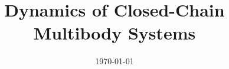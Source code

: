 \documentclass[11pt,oneside]{book}
\begin{document}
\hypersetup{pageanchor=false}
\title{Dynamics of Closed-Chain Multibody Systems}
\author{}
\date{\today}
\maketitle
\hypersetup{pageanchor=true}

\frontmatter
\tableofcontents




\mainmatter













\appendix


\backmatter
\bookbibliography
\end{document}
